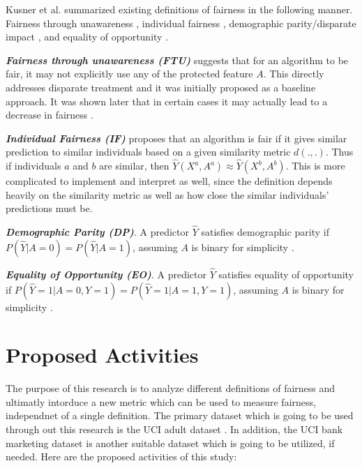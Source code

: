\documentclass[11pt]{article}
\begin{document}
Kusner et al. \cite{kusner2017counterfactual} summarized existing definitions of fairness in the following manner. Fairness through unawareness \cite{grgic2016case}, individual fairness \cite{dwork2012fairness, joseph2016rawlsian, louizos2015variational}, demographic parity/disparate impact \cite{zafar2017fairness}, and equality of opportunity \cite{hardt2016equality, zafar2017fairnessbeyond}.

\textbf{\textit{Fairness through unawareness (FTU)}} suggests that for an algorithm to be fair, it may not explicitly use any of the protected feature $A$. This directly addresses disparate treatment and it was initially proposed as a baseline approach. It was shown later that in certain cases it may actually lead to a decrease in fairness \cite{kusner2017counterfactual}.

\textbf{\textit{Individual Fairness (IF)}} proposes that an algorithm is fair if it gives similar prediction to similar individuals based on a given similarity metric $d(., .)$. Thus if individuals $a$ and $b$ are similar, then $\hat{Y}(X^a, A^a) \approx \hat{Y}(X^b, A^b)$. This is more complicated to implement and interpret as well, since the definition depends heavily on the similarity metric as well as how close the similar individuals' predictions must be.

\textbf{\textit{Demographic Parity (DP)}}. A predictor $\hat{Y}$ satisfies demographic parity if $P(\hat{Y} | A = 0) = P(\hat{Y} | A = 1)$, assuming $A$ is binary for simplicity \cite{kusner2017counterfactual}.

\textbf{\textit{Equality of Opportunity (EO)}}. A predictor $\hat{Y}$ satisfies equality of opportunity if $P(\hat{Y} = 1 | A = 0, Y = 1) = P(\hat{Y} = 1 | A = 1 , Y = 1)$, assuming $A$ is binary for simplicity \cite{kusner2017counterfactual}.

\section{Proposed Activities} \label{sec:proposed-activities}
The purpose of this research is to analyze different definitions of fairness and ultimatly intorduce a new metric which can be used to measure fairness, independnet of a single definition. The primary dataset which is going to be used through out this research is the UCI adult dataset \cite{Dua:2017}. In addition, the UCI bank marketing dataset \cite{Dua:2017, moro2014data} is another suitable dataset which is going to be utilized, if needed. Here are the proposed activities of this study:
\end{document}
